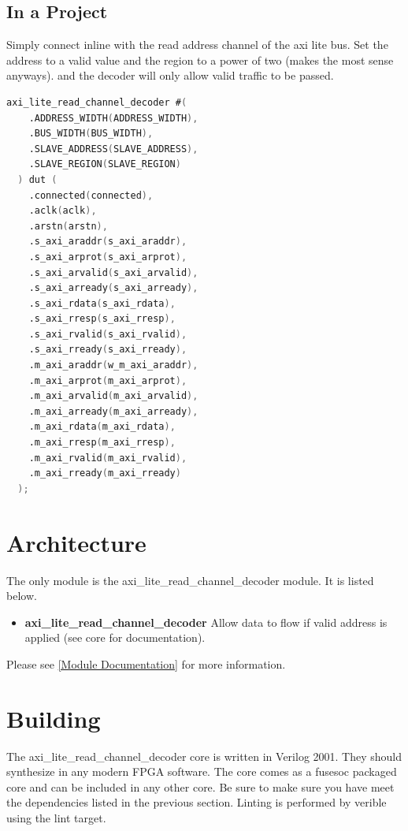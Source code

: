 \subsection{In a Project}
\par
Simply connect inline with the read address channel of the axi lite bus. Set the address to a valid value and the region to a power of two (makes the most sense anyways).
and the decoder will only allow valid traffic to be passed.

\begin{lstlisting}[language=Verilog]
  axi_lite_read_channel_decoder #(
    .ADDRESS_WIDTH(ADDRESS_WIDTH),
    .BUS_WIDTH(BUS_WIDTH),
    .SLAVE_ADDRESS(SLAVE_ADDRESS),
    .SLAVE_REGION(SLAVE_REGION)
  ) dut (
    .connected(connected),
    .aclk(aclk),
    .arstn(arstn),
    .s_axi_araddr(s_axi_araddr),
    .s_axi_arprot(s_axi_arprot),
    .s_axi_arvalid(s_axi_arvalid),
    .s_axi_arready(s_axi_arready),
    .s_axi_rdata(s_axi_rdata),
    .s_axi_rresp(s_axi_rresp),
    .s_axi_rvalid(s_axi_rvalid),
    .s_axi_rready(s_axi_rready),
    .m_axi_araddr(w_m_axi_araddr),
    .m_axi_arprot(m_axi_arprot),
    .m_axi_arvalid(m_axi_arvalid),
    .m_axi_arready(m_axi_arready),
    .m_axi_rdata(m_axi_rdata),
    .m_axi_rresp(m_axi_rresp),
    .m_axi_rvalid(m_axi_rvalid),
    .m_axi_rready(m_axi_rready)
  );
\end{lstlisting}

\section{Architecture}
\par
The only module is the axi\_lite\_read\_channel\_decoder module. It is listed below.

\begin{itemize}
  \item \textbf{axi\_lite\_read\_channel\_decoder} Allow data to flow if valid address is applied (see core for documentation).
\end{itemize}

Please see \ref{Module Documentation} for more information.

\section{Building}

\par
The axi\_lite\_read\_channel\_decoder core is written in Verilog 2001. They should synthesize in any modern FPGA software. The core comes as a fusesoc packaged core and can be included in any other core. Be sure to make sure you have meet the dependencies listed in the previous section. Linting is performed by verible using the lint target.

